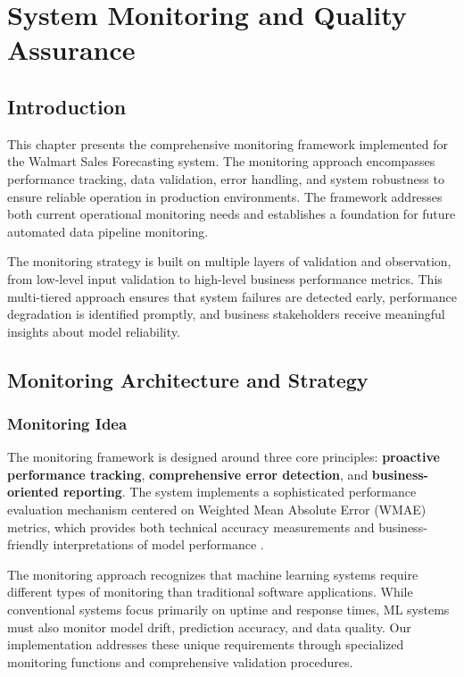 %
%
%


\chapter{System Monitoring and Quality Assurance}

\section{Introduction}

This chapter presents the comprehensive monitoring framework implemented for the Walmart Sales Forecasting system. The monitoring approach encompasses performance tracking, data validation, error handling, and system robustness to ensure reliable operation in production environments. The framework addresses both current operational monitoring needs and establishes a foundation for future automated data pipeline monitoring.

The monitoring strategy is built on multiple layers of validation and observation, from low-level input validation to high-level business performance metrics. This multi-tiered approach ensures that system failures are detected early, performance degradation is identified promptly, and business stakeholders receive meaningful insights about model reliability.

\section{Monitoring Architecture and Strategy}

\subsection{Monitoring Idea}

The monitoring framework is designed around three core principles: \textbf{proactive performance tracking}, \textbf{comprehensive error detection}, and \textbf{business-oriented reporting}. The system implements a sophisticated performance evaluation mechanism centered on Weighted Mean Absolute Error (WMAE) metrics, which provides both technical accuracy measurements and business-friendly interpretations of model performance .

The monitoring approach recognizes that machine learning systems require different types of monitoring than traditional software applications. While conventional systems focus primarily on uptime and response times, ML systems must also monitor model drift, prediction accuracy, and data quality. Our implementation addresses these unique requirements through specialized monitoring functions and comprehensive validation procedures.

